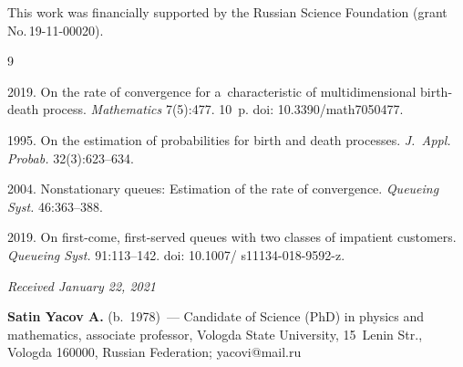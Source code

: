 



\vspace*{-12pt}

\Ack

\vspace*{-6pt}

\noindent
This work was financially supported by the Russian Science Foundation (grant No.\,19-11-00020).

\vspace*{-6pt}

\renewcommand{\bibname}{\protect\rmfamily References}

{\small\frenchspacing
{%
\begin{thebibliography}{9}

\vspace*{-4pt}

 2019. On the rate of convergence for a~characteristic of multidimensional birth-death process. 
 \textit{Mathematics} 7(5):477. 10~p.
 doi: 10.3390\!/\!math7050477.
 
 1995. On the estimation of probabilities for birth and death processes. 
\textit{J.~Appl. Probab.} 32(3):623--634.



 2004. Nonstationary queues: Estimation of the rate of convergence. 
\textit{Queueing Syst.} 46:363--388.

 2019. On first-come, first-served queues with two classes of impatient customers. 
  \textit{Queueing Syst.} 91:113--142.
 doi: 10.1007\!/ s11134-018-9592-z.
  \end{thebibliography}
} }

\vspace*{-6pt}

\hfill{\small\textit{Received January 22, 2021}} 

\vspace*{-16pt}

\Contrl

\vspace*{-5pt}

\noindent
\textbf{Satin Yacov A.} (b.\ 1978)~---  
Candidate of Science (PhD) in physics and mathematics, associate professor, 
Vologda State University, 15~Lenin Str., Vologda 160000, Russian Federation; \mbox{yacovi@mail.ru} 



\label{end\stat}

\renewcommand{\bibname}{\protect\rm Литература}     
     
